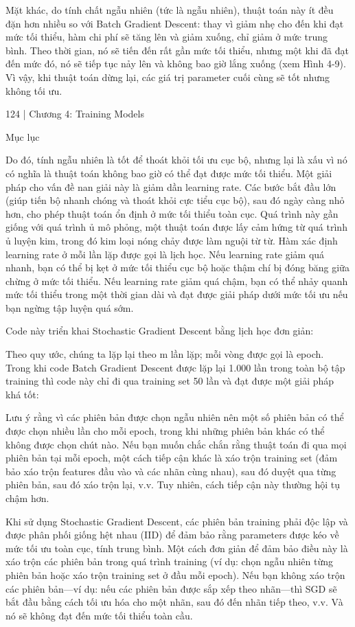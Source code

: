 Mặt khác, do tính chất ngẫu nhiên (tức là ngẫu nhiên), thuật toán này ít đều đặn hơn nhiều so với Batch Gradient Descent: thay vì giảm nhẹ cho đến khi đạt mức tối thiểu, hàm chi phí sẽ tăng lên và giảm xuống, chỉ giảm ở mức trung bình. Theo thời gian, nó sẽ tiến đến rất gần mức tối thiểu, nhưng một khi đã đạt đến mức đó, nó sẽ tiếp tục nảy lên và không bao giờ lắng xuống (xem Hình 4-9). Vì vậy, khi thuật toán dừng lại, các giá trị parameter cuối cùng sẽ tốt nhưng không tối ưu.

124 | Chương 4: Training Models

Mục lục

Do đó, tính ngẫu nhiên là tốt để thoát khỏi tối ưu cục bộ, nhưng lại là xấu vì nó có nghĩa là thuật toán không bao giờ có thể đạt được mức tối thiểu. Một giải pháp cho vấn đề nan giải này là giảm dần learning rate. Các bước bắt đầu lớn (giúp tiến bộ nhanh chóng và thoát khỏi cực tiểu cục bộ), sau đó ngày càng nhỏ hơn, cho phép thuật toán ổn định ở mức tối thiểu toàn cục. Quá trình này gần giống với quá trình ủ mô phỏng, một thuật toán được lấy cảm hứng từ quá trình ủ luyện kim, trong đó kim loại nóng chảy được làm nguội từ từ. Hàm xác định learning rate ở mỗi lần lặp được gọi là lịch học. Nếu learning rate giảm quá nhanh, bạn có thể bị kẹt ở mức tối thiểu cục bộ hoặc thậm chí bị đóng băng giữa chừng ở mức tối thiểu. Nếu learning rate giảm quá chậm, bạn có thể nhảy quanh mức tối thiểu trong một thời gian dài và đạt được giải pháp dưới mức tối ưu nếu bạn ngừng tập luyện quá sớm.

Code này triển khai Stochastic Gradient Descent bằng lịch học đơn giản:

Theo quy ước, chúng ta lặp lại theo m lần lặp; mỗi vòng được gọi là epoch. Trong khi code Batch Gradient Descent được lặp lại 1.000 lần trong toàn bộ tập training thì code này chỉ đi qua training set 50 lần và đạt được một giải pháp khá tốt:

Lưu ý rằng vì các phiên bản được chọn ngẫu nhiên nên một số phiên bản có thể được chọn nhiều lần cho mỗi epoch, trong khi những phiên bản khác có thể không được chọn chút nào. Nếu bạn muốn chắc chắn rằng thuật toán đi qua mọi phiên bản tại mỗi epoch, một cách tiếp cận khác là xáo trộn training set (đảm bảo xáo trộn features đầu vào và các nhãn cùng nhau), sau đó duyệt qua từng phiên bản, sau đó xáo trộn lại, v.v. Tuy nhiên, cách tiếp cận này thường hội tụ chậm hơn.

Khi sử dụng Stochastic Gradient Descent, các phiên bản training phải độc lập và được phân phối giống hệt nhau (IID) để đảm bảo rằng parameters được kéo về mức tối ưu toàn cục, tính trung bình. Một cách đơn giản để đảm bảo điều này là xáo trộn các phiên bản trong quá trình training (ví dụ: chọn ngẫu nhiên từng phiên bản hoặc xáo trộn training set ở đầu mỗi epoch). Nếu bạn không xáo trộn các phiên bản—ví dụ: nếu các phiên bản được sắp xếp theo nhãn—thì SGD sẽ bắt đầu bằng cách tối ưu hóa cho một nhãn, sau đó đến nhãn tiếp theo, v.v. Và nó sẽ không đạt đến mức tối thiểu toàn cầu.

